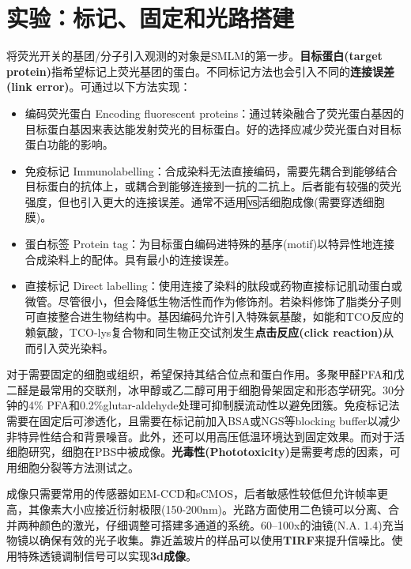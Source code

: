 \documentclass[12pt]{ctexart}%
\begin{document}
\section*{实验：标记、固定和光路搭建}
将荧光开关的基团/分子引入观测的对象是SMLM的第一步。\textbf{目标蛋白(target protein)}指希望标记上荧光基团的蛋白。不同标记方法也会引入不同的\textbf{连接误差(link error)}。可通过以下方法实现：
\begin{itemize}
    \item 编码荧光蛋白 Encoding fluorescent proteins：通过转染融合了荧光蛋白基因的目标蛋白基因来表达能发射荧光的目标蛋白。好的选择应减少荧光蛋白对目标蛋白功能的影响。
    \item 免疫标记 Immunolabelling：合成染料无法直接编码，需要先耦合到能够结合目标蛋白的抗体上，或耦合到能够连接到一抗的二抗上。后者能有较强的荧光强度，但也引入更大的连接误差。通常不适用🆚活细胞成像(需要穿透细胞膜)。
    \item 蛋白标签 Protein tag：为目标蛋白编码进特殊的基序(motif)以特异性地连接合成染料上的配体。具有最小的连接误差。
    \item 直接标记 Direct labelling：使用连接了染料的肽段或药物直接标记肌动蛋白或微管。尽管很小，但会降低生物活性而作为修饰剂。若染料修饰了脂类分子则可直接整合进生物结构中。基因编码允许引入特殊氨基酸，如能和TCO反应的赖氨酸，TCO-lys复合物和同生物正交试剂发生\textbf{点击反应(click reaction)}从而引入荧光染料。
\end{itemize}
\par 对于需要固定的细胞或组织，希望保持其结合位点和蛋白作用。多聚甲醛PFA和戊二醛是最常用的交联剂，冰甲醇或乙二醇可用于细胞骨架固定和形态学研究。30分钟的4\% PFA和0.2\%glutar-aldehyde处理可抑制膜流动性以避免团簇。免疫标记法需要在固定后可渗透化，且需要在标记前加入BSA或NGS等blocking buffer以减少非特异性结合和背景噪音。此外，还可以用高压低温环境达到固定效果。而对于活细胞研究，细胞在PBS中被成像。\textbf{光毒性(Phototoxicity)}是需要考虑的因素，可用细胞分裂等方法测试之。
\par 成像只需要常用的传感器如EM-CCD和sCMOS，后者敏感性较低但允许帧率更高，其像素大小应接近衍射极限(150-200nm)。光路方面使用二色镜可以分离、合并两种颜色的激光，仔细调整可搭建多通道的系统。60–100x的油镜(N.A. 1.4)充当物镜以确保有效的光子收集。靠近盖玻片的样品可以使用\textbf{TIRF}来提升信噪比。使用特殊透镜调制信号可以实现\textbf{3d成像}。
\end{document}
